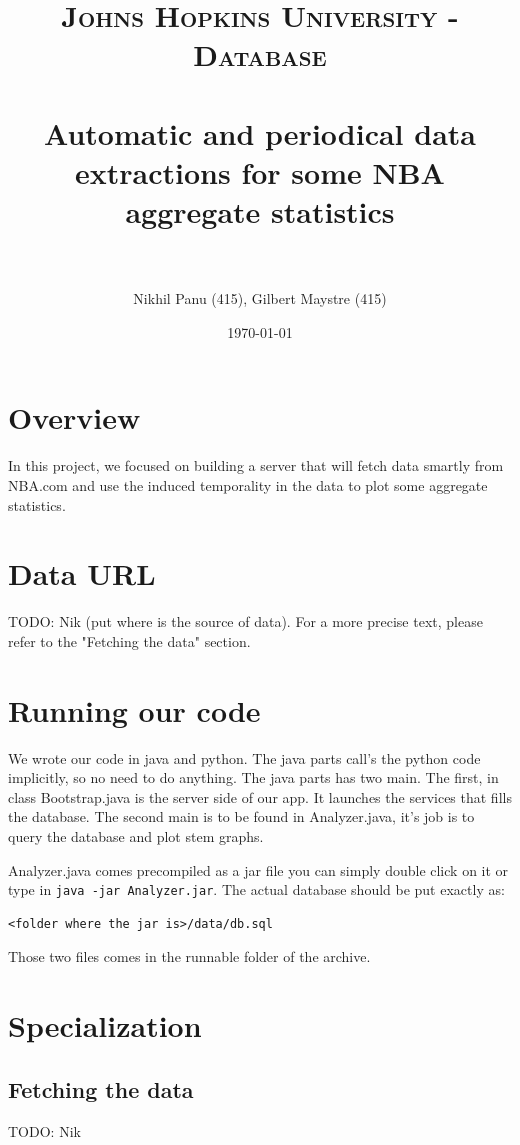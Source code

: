 \documentclass[paper=A4, fontsize=11pt]{scrartcl} %
\title{	
\normalfont \normalsize 
\textsc{Johns Hopkins University - Database} \\ [25pt] %
\horrule{0.5pt} \\[0.4cm] %
\huge Automatic and periodical data extractions for some NBA aggregate statistics \\ %
\horrule{2pt} \\[0.5cm] %
}
\author{Nikhil Panu (415), Gilbert Maystre (415)} %
\date{\normalsize\today} %
\begin{document}
\maketitle %
\newpage
\section{Overview}
In this project, we focused on building a server that will fetch data smartly from NBA.com and use the induced temporality in the data to plot some aggregate statistics.

\section{Data URL}

TODO: Nik (put where is the source of data). For a more precise text, please refer to the "Fetching the data" section.

\section{Running our code}
We wrote our code in java and python. The java parts call's the python code implicitly, so no need to do anything. The java parts has two main. The first, in class Bootstrap.java is the server side of our app. It launches the services that fills the database. The second main is to be found in Analyzer.java, it's job is to query the database and plot stem graphs. 

Analyzer.java comes precompiled as a jar file you can simply double click on it or type in \verb!java -jar Analyzer.jar!. The actual database should be put exactly as:

\begin{verbatim}
<folder where the jar is>/data/db.sql
\end{verbatim}

Those two files comes in the runnable folder of the archive.

\section{Specialization}

\subsection{Fetching the data}
TODO: Nik
\end{document}

